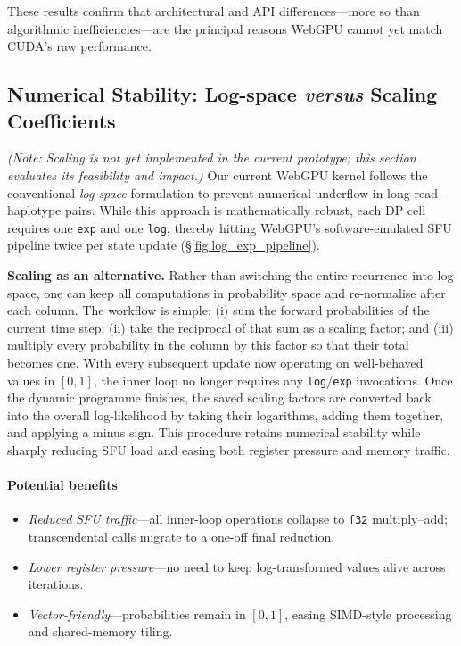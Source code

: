 \documentclass[PhD]{PHlab-thesis}
\begin{document}
These results confirm that architectural and API differences—more so than algorithmic inefficiencies—are the principal reasons WebGPU cannot yet match CUDA's raw performance.


\subsection{Numerical Stability: Log-space \emph{versus} Scaling Coefficients}
\textit{(Note: Scaling is not yet implemented in the current prototype; this
section evaluates its feasibility and impact.)}
Our current WebGPU kernel follows the conventional \emph{log-space} formulation
to prevent numerical underflow in long read–haplotype pairs.
While this approach is mathematically robust, each DP cell requires one
\texttt{exp} and one \texttt{log}, thereby hitting WebGPU’s software-emulated
SFU pipeline twice per state update (§\ref{fig:log_exp_pipeline}).

\vspace{0.4em}
\noindent\textbf{Scaling as an alternative.}\;
Rather than switching the entire recurrence into log space, one can keep all
computations in probability space and re-normalise after each column.  The
workflow is simple: (i) sum the forward probabilities of the current time
step; (ii) take the reciprocal of that sum as a scaling factor; and
(iii) multiply every probability in the column by this factor so that their
total becomes one.  With every subsequent update now operating on well-behaved
values in \([0,1]\), the inner loop no longer requires any
\texttt{log}/\texttt{exp} invocations.  Once the dynamic programme finishes,
the saved scaling factors are converted back into the overall log-likelihood
by taking their logarithms, adding them together, and applying a minus sign.
This procedure retains numerical stability while sharply reducing SFU load
and easing both register pressure and memory traffic.

\paragraph{Potential benefits}
\begin{itemize}
  \item \emph{Reduced SFU traffic}––all inner-loop
        operations collapse to \texttt{f32} multiply–add; transcendental calls
        migrate to a one-off final reduction.
  \item \emph{Lower register pressure}––no need to keep log-transformed values
        alive across iterations.
  \item \emph{Vector-friendly}––probabilities remain in \([0,1]\),
        easing SIMD-style processing and shared-memory tiling.
\end{itemize}
\end{document}
